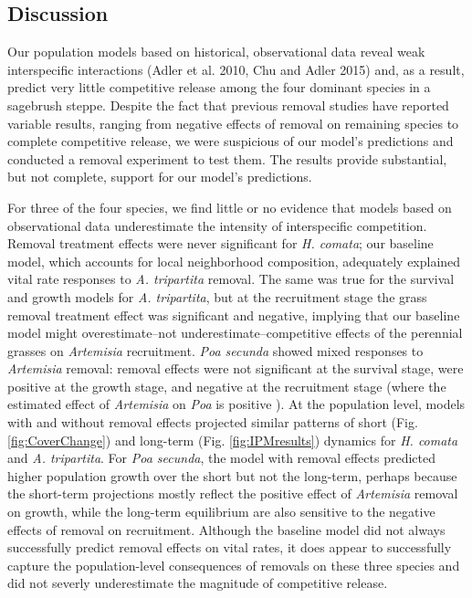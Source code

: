 \documentclass[11pt]{article}
\begin{document}
\begin{doublespacing}
\section*{Discussion}

Our population models based on historical, observational data reveal weak interspecific interactions (Adler et al. 2010, Chu and Adler 2015) and, as a result, predict very little competitive release among the four dominant species in a sagebrush steppe. Despite the fact that previous removal studies have reported variable results, ranging from negative effects of removal on remaining species to complete competitive release, we were suspicious of our model's predictions and conducted a removal experiment to test them. The results provide substantial, but not complete, support for our model's predictions.

For three of the four species, we find little or no evidence that models based on observational data underestimate the intensity of interspecific competition. Removal treatment effects were never significant for \textit{H. comata}; our baseline model, which accounts for local neighborhood composition, adequately explained vital rate responses to \textit{A. tripartita} removal. The same was true for the survival and growth models for \textit{A. tripartita}, but at the recruitment stage the grass removal treatment effect was significant and negative, implying that our baseline model might overestimate--not underestimate--competitive effects of the perennial grasses on \textit{Artemisia} recruitment. \textit{Poa secunda} showed mixed responses to \textit{Artemisia} removal: removal effects were not significant at the survival stage, were positive at the growth stage, and negative at the recruitment stage (where the estimated effect of \textit{Artemisia} on \textit{Poa} is positive ). At the population level, models with and without removal effects projected similar patterns of short (Fig. \ref{fig:CoverChange}) and long-term (Fig. \ref{fig:IPMresults}) dynamics for \textit{H. comata} and \textit{A. tripartita}. For \textit{Poa secunda}, the model with removal effects predicted higher population growth over the short but not the long-term, perhaps because the short-term projections mostly reflect the positive effect of \textit{Artemisia} removal on growth, while the long-term equilibrium are also sensitive to the negative effects of removal on recruitment. Although the baseline model did not always successfully predict removal effects on vital rates, it does appear to successfully capture the population-level consequences of removals on these three species and did not severly underestimate the magnitude of competitive release.


\end{doublespacing}
\end{document}
